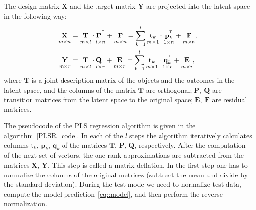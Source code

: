 \documentclass[12pt,twoside]{article}
\newcommand{\bY}{\mathbf{Y}}
\newcommand{\bX}{\mathbf{X}}
\newcommand{\bt}{\mathbf{t}}
\newcommand{\bp}{\mathbf{p}}
\newcommand{\bq}{\mathbf{q}}
\newcommand{\bP}{\mathbf{P}}
\newcommand{\bT}{\mathbf{T}}
\newcommand{\bQ}{\mathbf{Q}}
\newcommand{\bE}{\mathbf{E}}
\newcommand{\bF}{\mathbf{F}}
\newcommand{\T}{^{\text{\tiny\sffamily\upshape\mdseries T}}}
\begin{document}
The design matrix $\bX$ and the target matrix $\bY$ are projected into the latent space in the following way:
\begin{align}
\label{eq::PLS_X}
 \underset{m \times n}{\vphantom{\bQ}\bX} 
 &= \underset{m \times l}{\vphantom{\bQ}\bT} \cdot \underset{l \times n}{\vphantom{\bQ}\bP^{\T}} + \underset{m \times n}{\vphantom{\bQ}\bF} 
 = \sum_{k=1}^l \underset{m \times 1}{\vphantom{\bp_k^{\T}}\bt_k} \cdot \underset{1 \times n}{\bp_k^{\T}} + \underset{m \times n}{\vphantom{\bp_k^{\T}}\bF},\\
 \label{eq::PLS_Y}
 \underset{m \times r}{\vphantom{\bQ}\bY} 
 &= \underset{m \times l}{\vphantom{\bQ}\bT} \cdot \underset{l \times r}{\bQ^{\T}} + \underset{m \times r}{\vphantom{\bQ}\bE}
 =  \sum_{k=1}^l  \underset{m \times 1}{\vphantom{\bq_k^{\T}}\bt_k} \cdot \underset{1 \times r}{\bq_k^{\T}} +  \underset{m \times r}{\vphantom{\bq_k^{\T}}\bE},
\end{align}
where $\bT$ is a joint description matrix of the objects and the outcomes in the latent space, and the columns of the matrix $\bT$ are orthogonal; $\bP,\ \bQ$ are transition matrices from the latent space to the original space; $\bE,\ \bF$ are residual matrices.

The pseudocode of the PLS regression algorithm is given in the algorithm~\ref{PLSR_code}.
In each of the $l$ steps the algorithm iteratively calculates columns $\bt_k$, $\bp_k$, $\bq_k$ of the matrices $\bT$, $\bP$, $\bQ$, respectively. 
After the computation of the next set of vectors, the one-rank approximations are subtracted from the matrices $\bX$, $\bY$. 
This step is called a matrix deflation.
In the first step one has to normalize the columns of the original matrices (subtract the mean and divide by the standard deviation).
During the test mode we need to normalize test data, compute the model prediction~\eqref{eq::model}, and then perform the reverse normalization.
\end{document}
